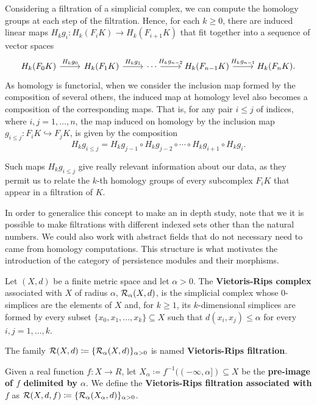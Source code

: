 Considering a filtration of a simplicial complex, we can compute the homology groups at each step of the filtration. Hence, for each $ k \geq 0 $, there are induced linear maps $ H_kg_i \colon H_k(F_iK) \to H_k(F_{i+1}K) $ that fit together into a sequence of vector spaces
\begin{equation}
\begin{tikzcd}
    H_k(F_0K) \arrow[r, "H_kg_0"] & H_k(F_1K) \arrow[r, "H_kg_1"] & \cdots \arrow[r, "H_kg_{n-2}"] & H_k(F_{n-1}K) \arrow[r, "H_kg_{n-1}"] & H_k(F_nK).
\end{tikzcd}
\end{equation}
As homology is functorial, when we consider the inclusion map formed by the composition of several others, the induced map at homology level also becomes a composition of the corresponding maps. That is, for any pair $ i \leq j $ of indices, where $ i, j = 1, \dots, n $, the map induced on homology by the inclusion map $ g_{i \leq j} \colon F_i K \hookrightarrow F_j K $, is given by the composition
\begin{equation}
    H_k g_{i \leq j} = H_k g_{j-1} \circ H_k g_{j-2} \circ \cdots \circ H_k g_{i+1} \circ H_k g_i.
\end{equation}

Such maps $ H_k g_{i \leq j} $ give really relevant information about our data, as they permit us to relate the $k$-th homology groups of every subcomplex $ F_i K $ that appear in a filtration of $ K $.

In order to generalice this concept to make an in depth study, note that we it is possible to make filtrations with different indexed sets other than the natural numbers. We could also work with abstract fields that do not necessary need to came from homology computations. This structure is what motivates the introduction of the category of persistence modules and their morphisms.

\begin{definition}
    Let $ (X, d) $ be a finite metric space and let $ \alpha > 0 $. The {\bf Vietoris-Rips complex} associated with $ X $ of radius $ \alpha $, $\mathcal{R}_\alpha(X, d)$, is the simplicial complex whose $0$-simplices are the elements of $X$ and, for $k \geq 1$, its $k$-dimensional simplices are formed by every subset $ \{x_0, x_1, \dots, x_k\} \subseteq X $ such that $d(x_i, x_j) \leq \alpha $ for every $i, j = 1, \dots, k$.

    The family $ \mathcal{R}(X, d) \coloneq \{\mathcal{R}_\alpha(X, d)\}_{\alpha>0}$ is named {\bf Vietoris-Rips filtration}. 

    Given a real function $ f \colon X \to R $, let $ X_\alpha \coloneq f^{-1}((-\infty, \alpha]) \subseteq X $ be the {\bf pre-image of $f$ delimited by $ \alpha $}. We define the {\bf Vietoris-Rips filtration associated with $ f $} as $ \mathcal{R}(X, d, f) \coloneq \{\mathcal{R}_\alpha(X_\alpha, d)\}_{\alpha>0}$.

\end{definition}

